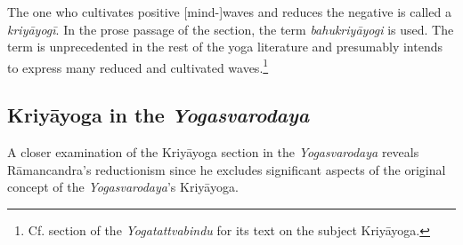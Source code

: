 The one who cultivates positive [mind-]waves and reduces the negative is called a \textit{kriyāyogī}. In the prose passage of the section, the term \textit{bahukriyāyogi} is used. The term is unprecedented in the rest of the yoga literature and presumably intends to express many reduced and cultivated waves.\footnote{Cf. section  of the \textit{Yogatattvabindu} for its text on the subject Kriyāyoga.} 

\subsection{Kriyāyoga in the \textit{Yogasvarodaya}}
A closer examination of the Kriyāyoga section in the \textit{Yogasvarodaya} reveals Rāmancandra's reductionism since he excludes significant aspects of the original concept of the \textit{Yogasvarodaya}'s Kriyāyoga.



